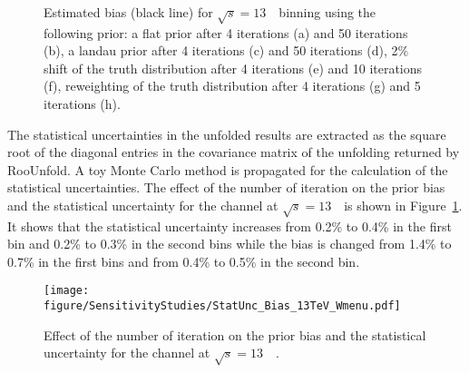 \begin{figure}[h]
\centering
{}
\\
\\
\\

\caption{Estimated bias (black line) for $\sqrt{s} = 13$~\TeV\ binning using the following prior: a flat prior after 4 iterations (a) and 50 iterations (b),  a landau  prior after 4 iterations (c) and 50 iterations (d), 2\% shift of the truth distribution after 4 iterations (e) and 10 iterations (f),  reweighting of the truth distribution after 4 iterations (g) and 5 iterations (h). }\end{figure}

The statistical uncertainties in the unfolded results are extracted as the square root of the diagonal entries in the covariance matrix of the unfolding returned by \textsf{RooUnfold}. A toy Monte Carlo method is propagated for the calculation of the statistical uncertainties. The effect of the number of iteration on the prior bias and the statistical uncertainty for the \Wmenu channel at $\sqrt{s} = 13$~\TeV\  is shown in Figure~\ref{fig:bias_stat_regularized}.  It shows that the statistical uncertainty increases from 0.2\% to 0.4\% in the first bin and 0.2\% to 0.3\% in the second bins while the bias is changed from 1.4\% to 0.7\% in the first bins and from  0.4\% to 0.5\% in the second bin.

\begin{figure}[h]
\centering
\texttt{[image: figure/SensitivityStudies/StatUnc\_Bias\_13TeV\_Wmenu.pdf]}
\caption{Effect of the number of iteration on the prior bias and the statistical uncertainty for the \Wmenu channel at $\sqrt{s} = 13$~\TeV\ . }
\label{fig:bias_stat_regularized}
\end{figure}

